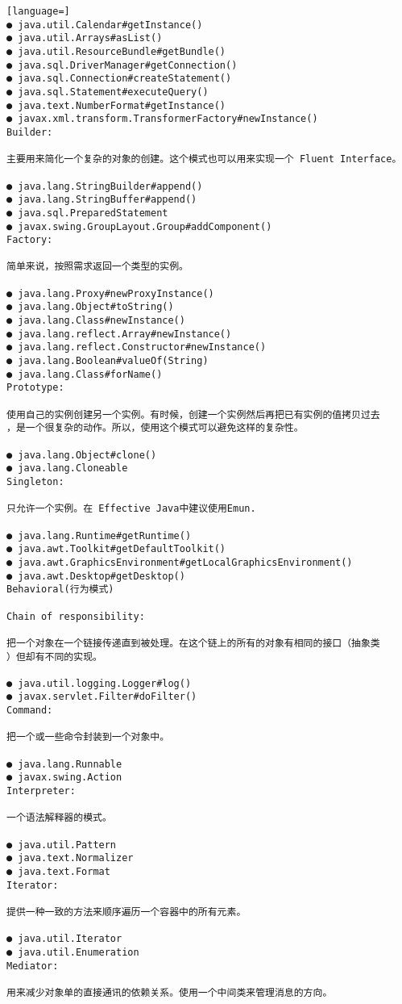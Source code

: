 \documentclass[a4paper,11pt]{book}
\begin{document}
\begin{lstlisting}[language=]
● java.util.Calendar#getInstance()
● java.util.Arrays#asList()
● java.util.ResourceBundle#getBundle()
● java.sql.DriverManager#getConnection()
● java.sql.Connection#createStatement()
● java.sql.Statement#executeQuery()
● java.text.NumberFormat#getInstance()
● javax.xml.transform.TransformerFactory#newInstance()
Builder:

主要用来简化一个复杂的对象的创建。这个模式也可以用来实现一个 Fluent Interface。

● java.lang.StringBuilder#append()
● java.lang.StringBuffer#append()
● java.sql.PreparedStatement
● javax.swing.GroupLayout.Group#addComponent()
Factory:

简单来说，按照需求返回一个类型的实例。

● java.lang.Proxy#newProxyInstance()
● java.lang.Object#toString()
● java.lang.Class#newInstance()
● java.lang.reflect.Array#newInstance()
● java.lang.reflect.Constructor#newInstance()
● java.lang.Boolean#valueOf(String)
● java.lang.Class#forName()
Prototype:

使用自己的实例创建另一个实例。有时候，创建一个实例然后再把已有实例的值拷贝过去
，是一个很复杂的动作。所以，使用这个模式可以避免这样的复杂性。

● java.lang.Object#clone()
● java.lang.Cloneable
Singleton:

只允许一个实例。在 Effective Java中建议使用Emun.

● java.lang.Runtime#getRuntime()
● java.awt.Toolkit#getDefaultToolkit()
● java.awt.GraphicsEnvironment#getLocalGraphicsEnvironment()
● java.awt.Desktop#getDesktop()
Behavioral(行为模式)

Chain of responsibility:

把一个对象在一个链接传递直到被处理。在这个链上的所有的对象有相同的接口（抽象类
）但却有不同的实现。

● java.util.logging.Logger#log()
● javax.servlet.Filter#doFilter()
Command:

把一个或一些命令封装到一个对象中。

● java.lang.Runnable
● javax.swing.Action
Interpreter:

一个语法解释器的模式。

● java.util.Pattern
● java.text.Normalizer
● java.text.Format
Iterator:

提供一种一致的方法来顺序遍历一个容器中的所有元素。

● java.util.Iterator
● java.util.Enumeration
Mediator:

用来减少对象单的直接通讯的依赖关系。使用一个中间类来管理消息的方向。


\end{lstlisting}
\end{document}
